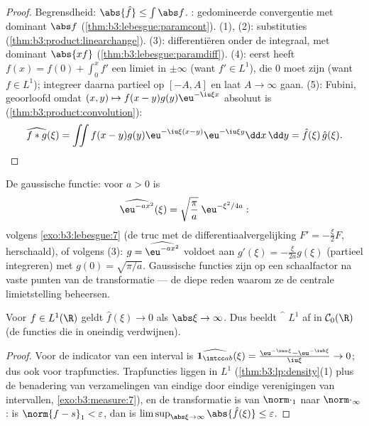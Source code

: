 \begin{proof}
Begrensdheid: $\abs{\hat f} \leq \int\abs f$. :
gedomineerde convergentie met dominant $\abs f$
(\cref{thm:b3:lebesgue:paramcont}). (1), (2): substituties
(\cref{thm:b3:product:linearchange}). (3): differentiëren onder
de integraal, met dominant $\abs{xf}$
(\cref{thm:b3:lebesgue:paramdiff}). (4): eerst heeft $f(x) = f(0)
+ \int_0^xf'$ een limiet in $\pm\infty$ (want $f' \in L^1$), die
$0$ moet zijn (want $f \in L^1$); integreer daarna partieel op
$[-A, A]$ en laat $A \to \infty$ gaan. (5): Fubini, geoorloofd
omdat $(x,y)\mapsto f(x - y)g(y)\eu^{-\iu\xi x}$ absoluut
 is (\cref{thm:b3:product:convolution}):
\[
\widehat{f*g}(\xi) = \iint f(x - y)g(y)\eu^{-\iu\xi(x - y)}
\eu^{-\iu\xi y}\dd x\,\dd y = \hat f(\xi)\,\hat g(\xi).
\]
\end{proof}

\begin{example}\label{ex:b3:fouriertransform:gaussian}
De gaussische functie: voor $a > 0$ is
\[
\widehat{\eu^{-ax^2}}(\xi) =
\sqrt{\frac\pi a}\;\eu^{-\xi^2/4a} :
\]
volgens \cref{exo:b3:lebesgue:7} (de truc met de
differentiaalvergelijking $F' = -\frac\xi{2}F$, herschaald), of
volgens (3): $g = \widehat{\eu^{-ax^2}}$ voldoet aan $g'(\xi) =
-\frac{\xi}{2a}g(\xi)$ (partieel integreren) met $g(0) =
\sqrt{\pi/a}$. Gaussische functies zijn op een schaalfactor na
vaste punten van de transformatie --- de diepe reden waarom ze de
centrale limietstelling beheersen.
\end{example}

\begin{theorem}
\label{thm:b3:fouriertransform:riemannlebesgue}
Voor $f \in L^1(\R)$ geldt $\hat f(\xi) \to 0$ als $\abs\xi \to
\infty$. Dus beeldt $\widehat{\phantom f}$ $L^1$ af in $\mathcal
C_0(\R)$ (de  functies die in oneindig
verdwijnen).
\end{theorem}

\begin{proof}
Voor de indicator van een interval is $\widehat{\mathbf 1_{\intcc
ab}}(\xi) = \frac{\eu^{-\iu a\xi} - \eu^{-\iu b\xi}}{\iu\xi} \to
0$; dus ook voor trapfuncties. Trapfuncties liggen  in $L^1$
(\cref{thm:b3:lp:density}(1) plus de benadering van
verzamelingen van eindige  door eindige verenigingen van
intervallen, \cref{exo:b3:measure:7}), en de transformatie is
 van $\norm\cdot_1$ naar $\norm\cdot_\infty$: is $\norm{f
- s}_1 < \varepsilon$, dan is
$\limsup_{\abs\xi\to\infty}\abs{\hat f(\xi)} \leq \varepsilon$.
\end{proof}

